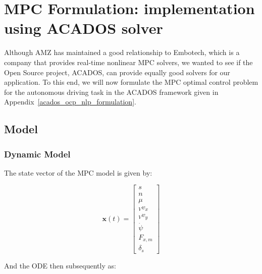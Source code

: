 \documentclass[
a4paper, %
10pt, %
notitlepage,
english]{CSUniSchoolLabReport}
\begin{document}
\chapter{MPC Formulation: implementation using ACADOS solver}

Although AMZ has maintained a good relationship to Embotech, which is a company that provides real-time nonlinear MPC solvers, we wanted to see if the Open Source project, ACADOS, can provide equally good solvers for our application. To this end, we will now formulate the MPC optimal control problem for the autonomous driving task in the ACADOS framework given in Appendix~\ref{acados_ocp_nlp_formulation}.

\section{Model}

\subsection{Dynamic Model}

The state vector of the MPC model is given by:

\begin{equation}
	\mathbf{x}(t) = 
	\left[\begin{array}{c}
		
		s \\ 
		
		n \\ 
		
		\mu \\
		
		{}_Vv_x \\
		
		{}_Vv_y \\
		
		\dot{\psi}\;\;\; \\
		
		F_{x,m} \\
		
		\delta_s
		
	\end{array}\right]
\end{equation}

And the ODE then subsequently as:
\end{document}
